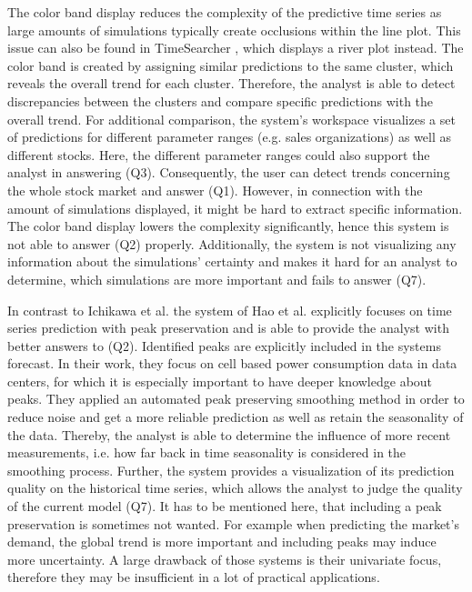 \documentclass[electronic]{vgtc}             %
\begin{document}
The color band display reduces the complexity of the predictive time series as large amounts of simulations typically create occlusions within the line plot.
This issue can also be found in TimeSearcher \cite{buono:2007}, which displays a river plot instead.
The color band is created by assigning similar predictions to the same cluster, which reveals the overall trend for each cluster.
Therefore, the analyst is able to detect discrepancies between the clusters and compare specific predictions with the overall trend. 
For additional comparison, the system's workspace visualizes a set of predictions for different parameter ranges (e.g. sales organizations) as well as different stocks.
Here, the different parameter ranges could also support the analyst in answering (Q3).
Consequently, the user can detect trends concerning the whole stock market and answer (Q1).  
However, in connection with the amount of simulations displayed, it might be hard to extract specific information.
The color band display lowers the complexity significantly, hence this system is not able to answer (Q2) properly.
Additionally, the system is not visualizing any information about the simulations' certainty and makes it hard for an analyst to determine, which simulations are more important and fails to answer (Q7).

In contrast to Ichikawa et al.\cite{ichikawa:2002} the system of Hao et al. \cite{Hao:2011, Hao:2009} explicitly focuses on time series prediction with peak preservation and is able to provide the analyst with better answers to (Q2).
Identified peaks are explicitly included in the systems forecast.
In their work, they focus on cell based power consumption data in data centers, for which it is especially important to have deeper knowledge about peaks.
They applied an automated peak preserving smoothing method in order to reduce noise and get a more reliable prediction as well as retain the seasonality of the data.
Thereby, the analyst is able to determine the influence of more recent measurements, i.e. how far back in time seasonality is considered in the smoothing process. 
Further, the system provides a visualization of its prediction quality on the historical time series, which allows the analyst to judge the quality of the current model (Q7). 
It has to be mentioned here, that including a peak preservation is sometimes not wanted.
For example when predicting the market's demand, the global trend is more important and including peaks may induce more uncertainty. 
A large drawback of those systems is their univariate focus, therefore they may be insufficient in a lot of practical applications.
\end{document}
